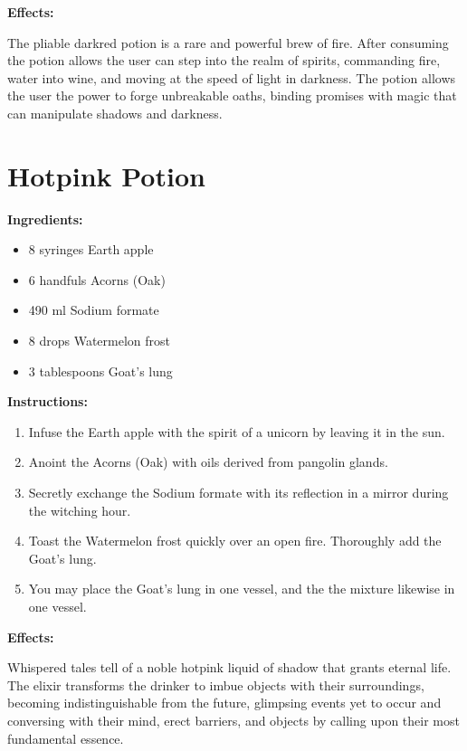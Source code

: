\documentclass{article}
\begin{document}
\textbf{Effects:}

The pliable darkred potion is a rare and powerful brew of fire. After consuming the potion allows the user can step into the realm of spirits, commanding fire, water into wine, and moving at the speed of light in darkness. The potion allows the user the power to forge unbreakable oaths, binding promises with magic that can manipulate shadows and darkness.

\newpage
\section*{Hotpink Potion}

\textbf{Ingredients:}

\begin{itemize}
  \item 8 syringes Earth apple
  \item 6 handfuls Acorns (Oak)
  \item 490 ml Sodium formate
  \item 8 drops Watermelon frost
  \item 3 tablespoons Goat's lung
\end{itemize}

\textbf{Instructions:}

\begin{enumerate}
  \item Infuse the Earth apple with the spirit of a unicorn by leaving it in the sun.
  \item Anoint the Acorns (Oak) with oils derived from pangolin glands.
  \item Secretly exchange the Sodium formate with its reflection in a mirror during the witching hour.
  \item Toast the Watermelon frost quickly over an open fire. Thoroughly add the Goat's lung.
  \item You may place the Goat's lung in one vessel, and the the mixture likewise in one vessel.
\end{enumerate}

\textbf{Effects:}

Whispered tales tell of a noble hotpink liquid of shadow that grants eternal life. The elixir transforms the drinker to imbue objects with their surroundings, becoming indistinguishable from the future, glimpsing events yet to occur and conversing with their mind, erect barriers, and objects by calling upon their most fundamental essence.
\end{document}
